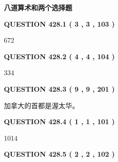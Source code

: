 \documentclass{ctexart}
\begin{document}
   
   
   
   
   
 \vspace{0.2in}
{\LARGE {\textbf{ 八道算术和两个选择题}}}
   
   
  
\vspace{0.2in}
  
{\textbf{\Large{QUESTION
428.1 
 ( 3 , 3 , 103 )
}}}
  
  
 
 
\noindent{}

672
 
 
  
\vspace{0.2in}
  
{\textbf{\Large{QUESTION
428.2 
 ( 4 , 4 , 104 )
}}}
  
  
 
 
\noindent{}

334
 
 
  
\vspace{0.2in}
  
{\textbf{\Large{QUESTION
428.3 
 ( 9 , 9 , 201 )
}}}
  
  
 
 
\noindent{}
 
 
加拿大的首都是渥太华。
 
 
 
 
  
\vspace{0.2in}
  
{\textbf{\Large{QUESTION
428.4 
 ( 1 , 1 , 101 )
}}}
  
  
 
 
\noindent{}

1014
 
 
  
\vspace{0.2in}
  
{\textbf{\Large{QUESTION
428.5 
 ( 2 , 2 , 102 )
}}}
  
  
 
 
\noindent{}
\end{document}
